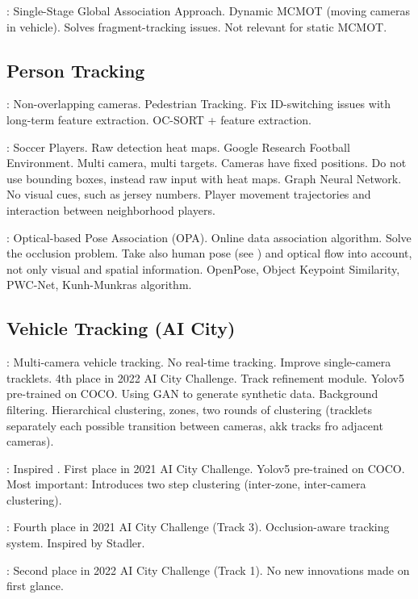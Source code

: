 \cite{Nguyen22b}: Single-Stage Global Association Approach. Dynamic MCMOT (moving cameras in vehicle). Solves fragment-tracking issues. Not relevant for static MCMOT.

\subsection{Person Tracking}

\cite{Huang23}: Non-overlapping cameras. Pedestrian Tracking. Fix ID-switching issues with long-term feature extraction. OC-SORT + feature extraction.

\cite{Komorowski22}: Soccer Players. Raw detection heat maps. Google Research Football Environment. Multi camera, multi targets. Cameras have fixed positions. Do not use bounding boxes, instead raw input with heat maps. Graph Neural Network. No visual cues, such as jersey numbers. Player movement trajectories and interaction between neighborhood players.

\cite{You21}: Optical-based Pose Association (OPA). Online data association algorithm. Solve the occlusion problem. Take also human pose (see \cite{Li19}) and optical flow into account, not only visual and spatial information. OpenPose, Object Keypoint Similarity, PWC-Net, Kunh-Munkras algorithm.

\subsection{Vehicle Tracking (AI City)}

\cite{Specker22}: Multi-camera vehicle tracking. No real-time tracking. Improve single-camera tracklets. 4th place in 2022 AI City Challenge. Track refinement module. Yolov5 pre-trained on COCO. Using GAN to generate synthetic data. Background filtering. Hierarchical clustering, zones, two rounds of clustering (tracklets separately each possible transition between cameras, akk tracks fro adjacent cameras).

\cite{Lui21}: Inspired \cite{Specker22}. First place in 2021 AI City Challenge. Yolov5 pre-trained on COCO. Most important: Introduces two step clustering (inter-zone, inter-camera clustering).

\cite{Specker21}: Fourth place in 2021 AI City Challenge (Track 3). Occlusion-aware tracking system. Inspired by Stadler.

\cite{Li22a}: Second place in 2022 AI City Challenge (Track 1). No new innovations made on first glance.

